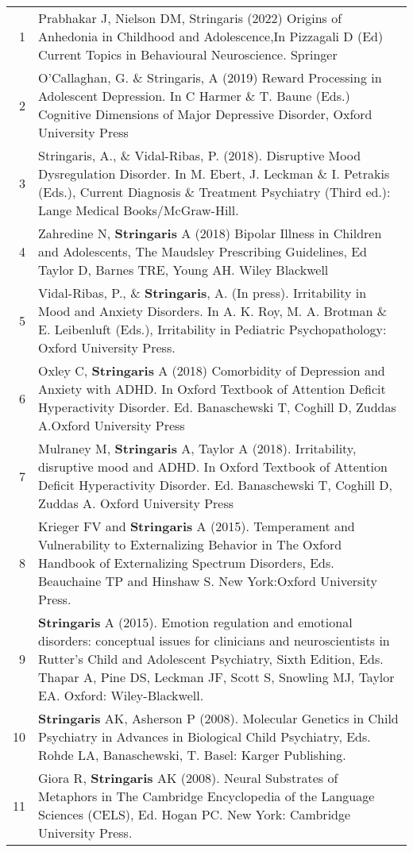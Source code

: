 \documentclass[
]{article}
\begin{document}
\begin{longtable}[]{@{}rl@{}}
\toprule
\endhead
1 & Prabhakar J, Nielson DM, Stringaris (2022) Origins of Anhedonia in
Childhood and Adolescence,In Pizzagali D (Ed) Current Topics in
Behavioural Neuroscience. Springer\tabularnewline
2 & O'Callaghan, G. \& Stringaris, A (2019) Reward Processing in
Adolescent Depression. In C Harmer \& T. Baune (Eds.) Cognitive
Dimensions of Major Depressive Disorder, Oxford University
Press\tabularnewline
3 & Stringaris, A., \& Vidal-Ribas, P. (2018). Disruptive Mood
Dysregulation Disorder. In M. Ebert, J. Leckman \& I. Petrakis (Eds.),
Current Diagnosis \& Treatment Psychiatry (Third ed.): Lange Medical
Books/McGraw-Hill.\tabularnewline
4 & Zahredine N, \textbf{Stringaris} A (2018) Bipolar Illness in
Children and Adolescents, The Maudsley Prescribing Guidelines, Ed Taylor
D, Barnes TRE, Young AH. Wiley Blackwell\tabularnewline
5 & Vidal-Ribas, P., \& \textbf{Stringaris}, A. (In press). Irritability
in Mood and Anxiety Disorders. In A. K. Roy, M. A. Brotman \& E.
Leibenluft (Eds.), Irritability in Pediatric Psychopathology: Oxford
University Press.\tabularnewline
6 & Oxley C, \textbf{Stringaris} A (2018) Comorbidity of Depression and
Anxiety with ADHD. In Oxford Textbook of Attention Deficit Hyperactivity
Disorder. Ed. Banaschewski T, Coghill D, Zuddas A.Oxford University
Press\tabularnewline
7 & Mulraney M, \textbf{Stringaris} A, Taylor A (2018). Irritability,
disruptive mood and ADHD. In Oxford Textbook of Attention Deficit
Hyperactivity Disorder. Ed. Banaschewski T, Coghill D, Zuddas A. Oxford
University Press\tabularnewline
8 & Krieger FV and \textbf{Stringaris} A (2015). Temperament and
Vulnerability to Externalizing Behavior in The Oxford Handbook of
Externalizing Spectrum Disorders, Eds. Beauchaine TP and Hinshaw S. New
York:Oxford University Press.\tabularnewline
9 & \textbf{Stringaris} A (2015). Emotion regulation and emotional
disorders: conceptual issues for clinicians and neuroscientists in
Rutter's Child and Adolescent Psychiatry, Sixth Edition, Eds. Thapar A,
Pine DS, Leckman JF, Scott S, Snowling MJ, Taylor EA. Oxford:
Wiley-Blackwell.\tabularnewline
10 & \textbf{Stringaris} AK, Asherson P (2008). Molecular Genetics in
Child Psychiatry in Advances in Biological Child Psychiatry, Eds. Rohde
LA, Banaschewski, T. Basel: Karger Publishing.\tabularnewline
11 & Giora R, \textbf{Stringaris} AK (2008). Neural Substrates of
Metaphors in The Cambridge Encyclopedia of the Language Sciences (CELS),
Ed. Hogan PC. New York: Cambridge University Press.\tabularnewline
\bottomrule
\end{longtable}
\end{document}
